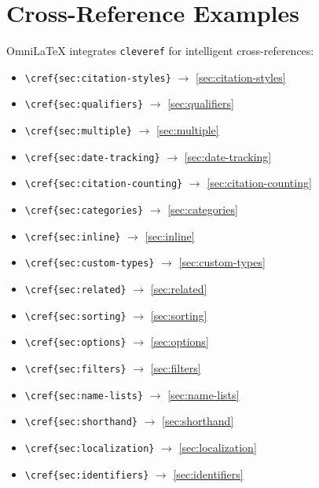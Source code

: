 \documentclass[
    language=english,
    doctype=article,
    institution=none,
]{../../omnilatex}
\begin{document}
\section{Cross-Reference Examples}
\label{sec:crossref}

OmniLaTeX integrates \texttt{cleveref} for intelligent cross-references:

\begin{itemize}
    \item \verb|\cref{sec:citation-styles}| $\to$ \cref{sec:citation-styles}
    \item \verb|\cref{sec:qualifiers}| $\to$ \cref{sec:qualifiers}
    \item \verb|\cref{sec:multiple}| $\to$ \cref{sec:multiple}
    \item \verb|\cref{sec:date-tracking}| $\to$ \cref{sec:date-tracking}
    \item \verb|\cref{sec:citation-counting}| $\to$ \cref{sec:citation-counting}
    \item \verb|\cref{sec:categories}| $\to$ \cref{sec:categories}
    \item \verb|\cref{sec:inline}| $\to$ \cref{sec:inline}
    \item \verb|\cref{sec:custom-types}| $\to$ \cref{sec:custom-types}
    \item \verb|\cref{sec:related}| $\to$ \cref{sec:related}
    \item \verb|\cref{sec:sorting}| $\to$ \cref{sec:sorting}
    \item \verb|\cref{sec:options}| $\to$ \cref{sec:options}
    \item \verb|\cref{sec:filters}| $\to$ \cref{sec:filters}
    \item \verb|\cref{sec:name-lists}| $\to$ \cref{sec:name-lists}
    \item \verb|\cref{sec:shorthand}| $\to$ \cref{sec:shorthand}
    \item \verb|\cref{sec:localization}| $\to$ \cref{sec:localization}
    \item \verb|\cref{sec:identifiers}| $\to$ \cref{sec:identifiers}
\end{itemize}

\printbibliography
\end{document}
